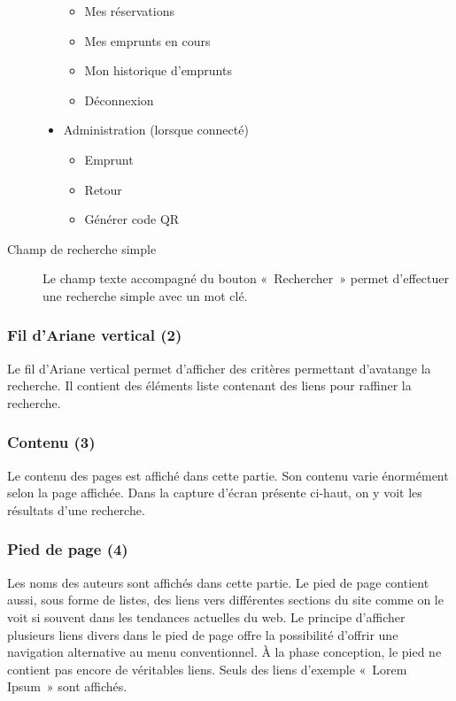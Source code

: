 \documentclass[letter, 11pt]{report}
\begin{document}
\begin{description}
\begin{itemize}
\begin{itemize}
				\item Mes réservations
				\item Mes emprunts en cours
				\item Mon historique d'emprunts
				\item Déconnexion
			\end{itemize}
		\end{itemize}
			\begin{itemize}
			\item Administration (lorsque connecté)
			\begin{itemize}
				\item Emprunt
				\item Retour
				\item Générer code QR
			\end{itemize}
		\end{itemize}
	\item[Champ de recherche simple] Le champ texte accompagné du bouton «~Rechercher~» permet d'effectuer une recherche simple avec un mot clé.
\end{description}

\subsubsection{Fil d'Ariane vertical (2)}
Le fil d'Ariane vertical permet d'afficher des critères permettant d'avatange la recherche. Il contient des éléments liste contenant des liens pour raffiner la recherche.

\subsubsection{Contenu (3)}
Le contenu des pages est affiché dans cette partie. Son contenu varie énormément selon la page affichée. Dans la capture d'écran présente ci-haut, on y voit les résultats d'une recherche.

\subsubsection{Pied de page (4)}
Les noms des auteurs sont affichés dans cette partie. Le pied de page contient aussi, sous forme de listes, des liens vers différentes sections du site comme on le voit si souvent dans les tendances actuelles du web. Le principe d'afficher plusieurs liens divers dans le pied de page offre la possibilité d'offrir une navigation alternative au menu conventionnel. À la phase conception, le pied ne contient pas encore de véritables liens. Seuls des liens d'exemple «~Lorem Ipsum~» sont affichés.
\end{document}
